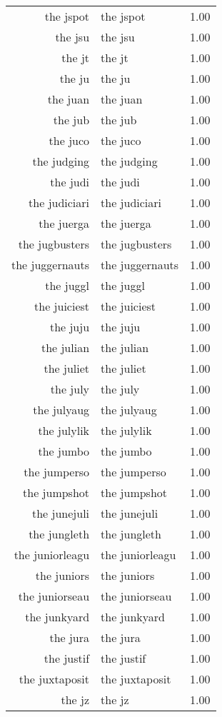 \begin{table}[ht]
\begin{tabular}{rlr}
  the jspot & the jspot & 1.00 \\ 
  the jsu & the jsu & 1.00 \\ 
  the jt & the jt & 1.00 \\ 
  the ju & the ju & 1.00 \\ 
  the juan & the juan & 1.00 \\ 
  the jub & the jub & 1.00 \\ 
  the juco & the juco & 1.00 \\ 
  the judging & the judging & 1.00 \\ 
  the judi & the judi & 1.00 \\ 
  the judiciari & the judiciari & 1.00 \\ 
  the juerga & the juerga & 1.00 \\ 
  the jugbusters & the jugbusters & 1.00 \\ 
  the juggernauts & the juggernauts & 1.00 \\ 
  the juggl & the juggl & 1.00 \\ 
  the juiciest & the juiciest & 1.00 \\ 
  the juju & the juju & 1.00 \\ 
  the julian & the julian & 1.00 \\ 
  the juliet & the juliet & 1.00 \\ 
  the july & the july & 1.00 \\ 
  the julyaug & the julyaug & 1.00 \\ 
  the julylik & the julylik & 1.00 \\ 
  the jumbo & the jumbo & 1.00 \\ 
  the jumperso & the jumperso & 1.00 \\ 
  the jumpshot & the jumpshot & 1.00 \\ 
  the junejuli & the junejuli & 1.00 \\ 
  the jungleth & the jungleth & 1.00 \\ 
  the juniorleagu & the juniorleagu & 1.00 \\ 
  the juniors & the juniors & 1.00 \\ 
  the juniorseau & the juniorseau & 1.00 \\ 
  the junkyard & the junkyard & 1.00 \\ 
  the jura & the jura & 1.00 \\ 
  the justif & the justif & 1.00 \\ 
  the juxtaposit & the juxtaposit & 1.00 \\ 
  the jz & the jz & 1.00 \\ 

\end{tabular}
\end{table}

